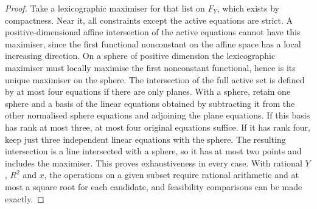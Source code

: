 \begin{proof}
Take a lexicographic maximiser for that list on $F_Y$, which exists by compactness. Near
it, all constraints except the active equations are strict. A positive-dimensional affine
intersection of the active equations cannot have this maximiser, since the first
functional nonconstant on the affine space has a local increasing direction. On a sphere
of positive dimension the lexicographic maximiser must locally maximise the first
nonconstant functional, hence is its unique maximiser on the sphere. The intersection of
the full active set is defined by at most four equations if there are only planes. With a
sphere, retain one sphere and a basis of the linear equations obtained by subtracting it
from the other normalised sphere equations and adjoining the plane equations. If this
basis has rank at most three, at most four original equations suffice. If it has rank
four, keep just three independent linear equations with the sphere. The resulting
intersection is a line intersected with a sphere, so it has at most two points and
includes the maximiser. This proves exhaustiveness in every case. With rational $Y$, $R^2$
and $x$, the operations on a given subset require rational arithmetic and at most a square
root for each candidate, and feasibility comparisons can be made exactly.
\end{proof}

